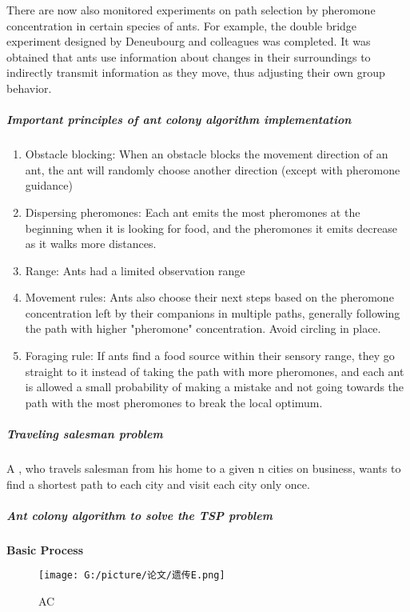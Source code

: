 \documentclass[twocolumn]{article}
\begin{document}
There are now also monitored experiments on path selection by pheromone
concentration in certain species of ants. For example, the double bridge
experiment designed by Deneubourg and colleagues was completed. It was
obtained that ants use information about changes in their surroundings
to indirectly transmit information as they move, thus adjusting their
own group behavior.

\subparagraph{Important principles of ant colony algorithm implementation}\label{important-principles-of-ant-colony-algorithm-implementation}

\begin{enumerate}
\def\labelenumi{\arabic{enumi}.}
\item
Obstacle blocking: When an obstacle blocks the movement direction of
an ant, the ant will randomly choose another direction (except with
pheromone guidance)
\item
Dispersing pheromones: Each ant emits the most pheromones at the
beginning when it is looking for food, and the pheromones it emits
decrease as it walks more distances.
\item
Range: Ants had a limited observation range
\item
Movement rules: Ants also choose their next steps based on the pheromone concentration left by their companions in multiple paths, generally following the path with higher "pheromone" concentration.
Avoid circling in place.
\item
Foraging rule: If ants find a food source within their sensory range,
they go straight to it instead of taking the path with more
pheromones, and each ant is allowed a small probability of making a
mistake and not going towards the path with the most pheromones to
break the local optimum.
\end{enumerate}

\subparagraph{Traveling salesman problem}\label{traveling-salesman-problem}

A , who travels salesman from his home to a given n cities on business,
wants to find a shortest path to each city and visit each city only
once.

\subparagraph{Ant colony algorithm to solve the TSP problem}


\textbf{Basic Process}

\begin{figure}[H]
	\centering
	\texttt{[image: G:/picture/论文/遗传E.png]}
	\caption{AC}
\end{figure}
\end{document}
